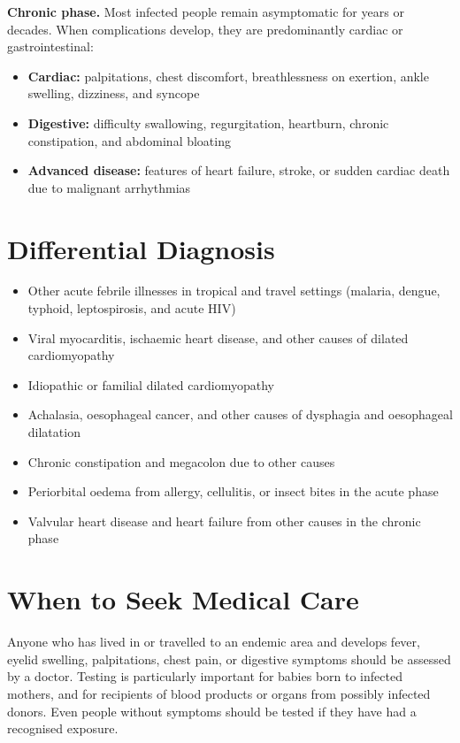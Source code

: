 \medskip
\textbf{Chronic phase.} Most infected people remain asymptomatic for years or decades. When complications develop, they are predominantly cardiac or gastrointestinal:
\begin{itemize}
    \item \textbf{Cardiac:} palpitations, chest discomfort, breathlessness on exertion, ankle swelling, dizziness, and syncope
    \item \textbf{Digestive:} difficulty swallowing, regurgitation, heartburn, chronic constipation, and abdominal bloating
    \item \textbf{Advanced disease:} features of heart failure, stroke, or sudden cardiac death due to malignant arrhythmias
\end{itemize}

\section*{Differential Diagnosis}
\begin{itemize}
    \item Other acute febrile illnesses in tropical and travel settings (malaria, dengue, typhoid, leptospirosis, and acute HIV)
    \item Viral myocarditis, ischaemic heart disease, and other causes of dilated cardiomyopathy
    \item Idiopathic or familial dilated cardiomyopathy
    \item Achalasia, oesophageal cancer, and other causes of dysphagia and oesophageal dilatation
    \item Chronic constipation and megacolon due to other causes
    \item Periorbital oedema from allergy, cellulitis, or insect bites in the acute phase
    \item Valvular heart disease and heart failure from other causes in the chronic phase
\end{itemize}

\section*{When to Seek Medical Care}
Anyone who has lived in or travelled to an endemic area and develops fever, eyelid swelling, palpitations, chest pain, or digestive symptoms should be assessed by a doctor. Testing is particularly important for babies born to infected mothers, and for recipients of blood products or organs from possibly infected donors. Even people without symptoms should be tested if they have had a recognised exposure.

